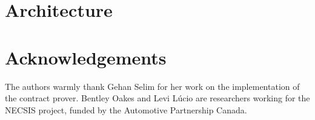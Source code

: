 \documentclass[conference]{IEEEtran}
\begin{document}
\section{Architecture}
\label{sec:arch} 

%
%
%
%
%
%
%
%
%
%

\section*{Acknowledgements}
The authors warmly thank Gehan Selim for her work on the
implementation of the contract prover. Bentley Oakes and Levi L\'ucio are
researchers working for the NECSIS project, funded by the Automotive Partnership
Canada. %



\end{document}
